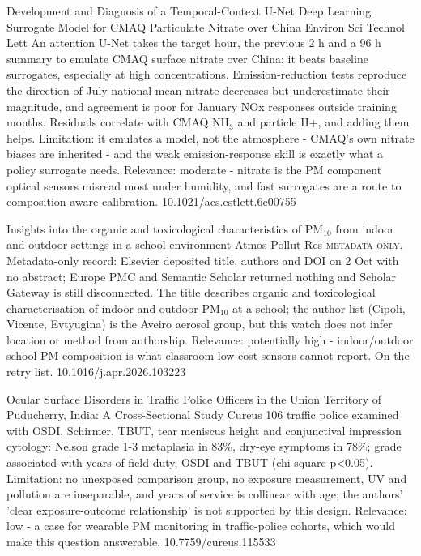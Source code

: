 \documentclass[10pt]{article}
\begin{document}
{Development and Diagnosis of a Temporal-Context U-Net Deep Learning Surrogate Model for CMAQ Particulate Nitrate over China}
{Environ Sci Technol Lett}
{An attention U-Net takes the target hour, the previous 2 h and a 96 h summary to emulate CMAQ surface nitrate over China; it beats baseline surrogates, especially at high concentrations. Emission-reduction tests reproduce the direction of July national-mean nitrate decreases but underestimate their magnitude, and agreement is poor for January NOx responses outside training months. Residuals correlate with CMAQ NH$_3$ and particle H+, and adding them helps. Limitation: it emulates a model, not the atmosphere - CMAQ's own nitrate biases are inherited - and the weak emission-response skill is exactly what a policy surrogate needs. Relevance: moderate - nitrate is the PM component optical sensors misread most under humidity, and fast surrogates are a route to composition-aware calibration.}
{10.1021/acs.estlett.6c00755}

\par{}\baselineskip{}\baselineskip
{}

{Insights into the organic and toxicological characteristics of PM$_{10}$ from indoor and outdoor settings in a school environment}
{Atmos Pollut Res}
{\textsc{metadata only.} Metadata-only record: Elsevier deposited title, authors and DOI on 2 Oct with no abstract; Europe PMC and Semantic Scholar returned nothing and Scholar Gateway is still disconnected. The title describes organic and toxicological characterisation of indoor and outdoor PM$_{10}$ at a school; the author list (Cipoli, Vicente, Evtyugina) is the Aveiro aerosol group, but this watch does not infer location or method from authorship. Relevance: potentially high - indoor/outdoor school PM composition is what classroom low-cost sensors cannot report. On the retry list.}
{10.1016/j.apr.2026.103223}

{Ocular Surface Disorders in Traffic Police Officers in the Union Territory of Puducherry, India: A Cross-Sectional Study}
{Cureus}
{106 traffic police examined with OSDI, Schirmer, TBUT, tear meniscus height and conjunctival impression cytology: Nelson grade 1-3 metaplasia in 83\%, dry-eye symptoms in 78\%; grade associated with years of field duty, OSDI and TBUT (chi-square p<0.05). Limitation: no unexposed comparison group, no exposure measurement, UV and pollution are inseparable, and years of service is collinear with age; the authors' 'clear exposure-outcome relationship' is not supported by this design. Relevance: low - a case for wearable PM monitoring in traffic-police cohorts, which would make this question answerable.}
{10.7759/cureus.115533}
\end{document}
